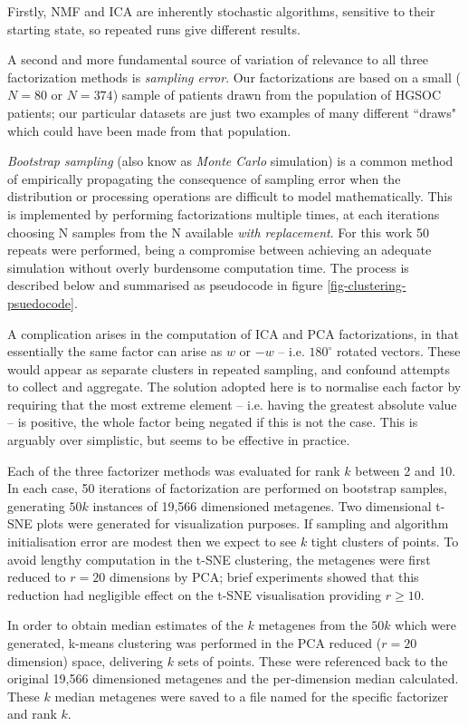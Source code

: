 \documentclass[tikz, 11pt,a4paper,oneside,fleqn, draft]{article}
\begin{document}
Firstly, NMF and ICA are inherently stochastic algorithms, sensitive to their starting state, so repeated runs give different results.

A second and more fundamental source of variation of relevance to all three factorization methods is \emph{sampling error}.   Our factorizations are based on a small ($N=80$ or $N=374$) sample of patients drawn from the population of HGSOC patients; our particular datasets are just two examples of many different ``draws" which could have been made from that population.

\emph{Bootstrap sampling} (also know as \emph{Monte Carlo} simulation) is a common method of empirically propagating the consequence of sampling error when the distribution or processing operations are difficult to model mathematically.   This is implemented by performing factorizations multiple times, at each iterations choosing N samples from the N available \emph{with replacement}.   For this work 50 repeats were performed, being a compromise between achieving an adequate simulation without overly burdensome computation time.  The process is described below and summarised as pseudocode in figure \ref{fig-clustering-psuedocode}.  

A complication arises in the computation of ICA and PCA factorizations, in that essentially the same factor can arise as $w$ or $-w$ -- i.e. $180^\circ$ rotated vectors. These would appear as separate clusters in repeated sampling, and confound attempts to collect and aggregate.  The solution adopted here is to normalise each factor by requiring that the most extreme element -- i.e. having the greatest absolute value -- is positive, the whole factor being negated if this is not the case.  This is arguably over simplistic, but seems to be effective in practice.

Each of the three factorizer methods was evaluated for rank $k$ between 2 and 10.  In each case, 50 iterations of factorization are performed on bootstrap samples, generating $50 k$ instances of 19,566 dimensioned metagenes.  Two dimensional t-SNE plots were generated for visualization purposes.   If sampling and algorithm initialisation error are modest then we expect to see $k$ tight clusters of points.   To avoid lengthy computation in the t-SNE clustering, the metagenes were first reduced to $r=20$ dimensions by PCA; brief experiments showed that this reduction had negligible effect on the t-SNE visualisation providing $r \geq 10$.   

In order to obtain median estimates of the $k$ metagenes from the $50 k$ which were generated, k-means clustering was performed in the PCA reduced ($r=20$ dimension) space, delivering $k$ sets of points.  These were referenced back to the original 19,566 dimensioned metagenes and the per-dimension median calculated.  These $k$ median metagenes were saved to a file named for the specific factorizer and rank $k$.  
\end{document}
